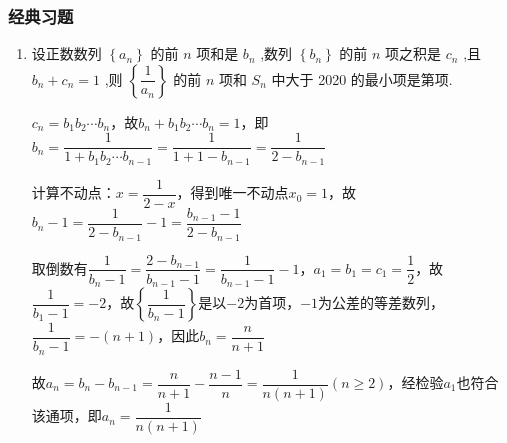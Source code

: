 \subsubsection*{经典习题}
\begin{enumerate}
    \item 设正数数列 $\left\{  {a}_{n}\right\}$ 的前 $n$ 项和是 ${b}_{n}$ ,数列 $\left\{  {b}_{n}\right\}$ 的前 $n$ 项之积是 ${c}_{n}$ ,且 ${b}_{n} + {c}_{n} = 1$ ,则 $\left\{  \dfrac{1}{{a}_{n}}\right\}$ 的前 $n$ 项和 ${S}_{n}$ 中大于 2020 的最小项是第项.
    \begin{jieda}
        $c_n = b_1b_2\cdots b_n$，故$b_n + b_1b_2\cdots b_n = 1$，即$b_n = \dfrac{1}{1+b_1b_2\cdots b_{n-1}} = \dfrac{1}{1+1-b_{n-1}} = \dfrac{1}{2-b_{n-1}}$
    
        计算不动点：$x = \dfrac{1}{2-x}$，得到唯一不动点$x_0 = 1$，故$b_n - 1 = \dfrac{1}{2-b_{n-1}}-1 = \dfrac{b_{n-1} - 1}{2 - b_{n-1}}$
        
        取倒数有$\dfrac{1}{b_n - 1} = \dfrac{2 - b_{n-1}}{b_{n-1} - 1} = \dfrac{1}{b_{n-1} - 1} - 1$，$a_1 = b_1 = c_1 = \dfrac{1}{2}$，故$\dfrac{1}{b_1 - 1} = -2$，故$\left\{\dfrac{1}{b_n - 1}\right\}$是以$-2$为首项，$-1$为公差的等差数列，$\dfrac{1}{b_n - 1} = -(n+1)$，因此$b_n = \dfrac{n}{n+1}$
    
        故$a_n = b_n - b_{n-1} = \dfrac{n}{n+1} - \dfrac{n-1}{n} = \dfrac{1}{n(n+1)} (n \geq 2)$，经检验$a_1$也符合该通项，即$a_n = \dfrac{1}{n(n+1)}$
    

\end{jieda}
\end{enumerate}
